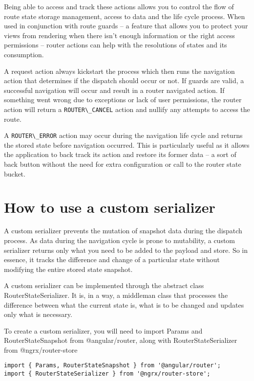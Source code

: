 Being able to access and track these actions allows you to control the flow of
route state storage management, access to data and the life cycle process. When
used in conjunction with route guards – a feature that allows you to protect
your views from rendering when there isn’t enough information or the right
access permissions – router actions can help with the resolutions of states and
its consumption.

A request action always kickstart the process which then runs the navigation
action that determines if the dispatch should occur or not. If guards are valid,
a successful navigation will occur and result in a router navigated action. If
something went wrong due to exceptions or lack of user permissions, the router
action will return a \lstinline{ROUTER\_CANCEL} action and nullify any attempts to
access the route.

A \lstinline{ROUTER\_ERROR} action may occur during the navigation life cycle and
returns the stored state before navigation occurred. This is particularly useful
as it allows the application to back track its action and restore its former
data – a sort of back button without the need for extra configuration or call
to the router state bucket.

\section{How to use a custom serializer}

A custom serializer prevents the mutation of snapshot data during the dispatch
process. As data during the navigation cycle is prone to mutability, a custom
serializer returns only what you need to be added to the payload and store. So
in essence, it tracks the difference and change of a particular state without
modifying the entire stored state snapshot.

A custom serializer can be implemented through the abstract class
RouterStateSerializer. It is, in a way, a middleman class that processes the
difference between what the current state is, what is to be changed and updates
only what is necessary.

To create a custom serializer, you will need to import Params and
RouterStateSnapshot from @angular/router, along with RouterStateSerializer from
@ngrx/router-store
\begin{verbatim}
import { Params, RouterStateSnapshot } from '@angular/router';
import { RouterStateSerializer } from '@ngrx/router-store';
\end{verbatim}

